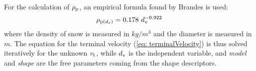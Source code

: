 		For the calculation of $ \rho_{\textup{p}} $, an empirical formula found by Brandes \cite{Brandes-2008} is used:
		\begin{equation}
			\rho_{\textup{p}(\dv)} = 0.178\ \dv^{-0.922}
		\end{equation}
		where the density of snow is measured in $ kg / m^3 $ and the diameter is measured in $ m $. 
		The equation for the terminal velocity (\ref{eq: terminalVelocity}) is thus solved iteratively for the unknown $ v_{\textup{t}} $, while $ d_{\textup{v}} $ is the independent variable, and \textit{model} and \textit{shape} are the free parameters coming from the shape descriptors.
		
	
